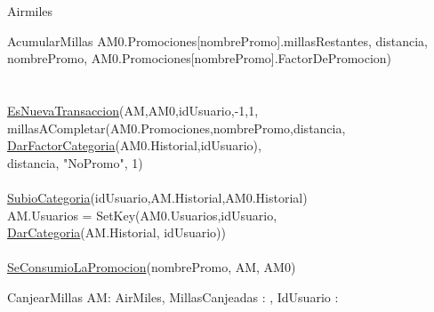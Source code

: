 \documentclass[11pt,a4paper]{article}
\newcommand{\Tipo}[1]{\mathsf{#1}}
\begin{document}
\begin{tad}{Airmiles}
\begin{proc}{AcumularMillas}
{		AM0.Promociones[nombrePromo].millasRestantes, distancia,
		\\ nombrePromo, AM0.Promociones[nombrePromo].FactorDePromocion) \yLuego
		\\
		\\
		\\
		\hyperref[sec:EsNuevaTransaccion]{EsNuevaTransaccion}(AM,AM0,idUsuario,-1,1,
		\\
		millasACompletar(AM0.Promociones,nombrePromo,distancia,
		\\\hyperref[sec:DarFactorCategoria]{DarFactorCategoria}(AM0.Historial,idUsuario),
		\\distancia, "NoPromo", 1) \yLuego
		\\
		\\
		\hyperref[sec:SubioCategoria]{SubioCategoria}(idUsuario,AM.Historial,AM0.Historial) \implicaLuego
		\\
		AM.Usuarios = SetKey(AM0.Usuarios,idUsuario,
		\\
		\hyperref[sec:DarCategoria]{DarCategoria}(AM.Historial, idUsuario)) \land
		\\
		\\
		\hyperref[sec:SeConsumioLaPromocion]{SeConsumioLaPromocion}(nombrePromo, AM, AM0)
	}
\end{proc}

\vspace{1cm}
\hypertarget{sec:CanjearMillas}{}\label{sec:CanjearMillas}
\begin{proc}{CanjearMillas}
	{\Inout AM: AirMiles, \In MillasCanjeadas : \Tipo{\R}, \In IdUsuario : \Tipo{\Z}}
	{}
\end{proc}


\end{tad}
\end{document}
